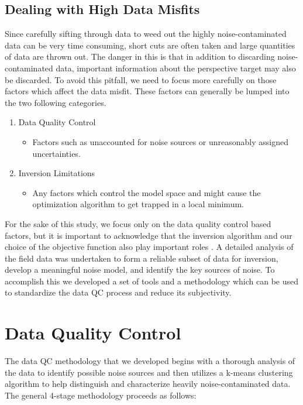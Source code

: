 \documentclass[final,authoryear,5p,times,twocolumn]{elsarticle}
\begin{document}
\subsection{Dealing with High Data Misfits}
\label{Dealing_With_High_Misfits}
Since carefully sifting through data to weed out the highly noise-contaminated data can be very time consuming, short cuts are often taken and large quantities of data are thrown out. The danger in this is that in addition to discarding noise-contaminated data, important information about the perspective target may also be discarded. To avoid this pitfall, we need to focus more carefully on those factors which affect the data misfit. These factors can generally be lumped into the two following categories. 

\begin{enumerate}
   \item Data Quality Control
      \begin{itemize}
         \item Factors such as unaccounted for noise sources or unreasonably assigned uncertainties.
      \end{itemize}
   \item Inversion Limitations
      \begin{itemize}
         \item Any factors which control the model space and might cause the optimization algorithm to get trapped in a local minimum. 
      \end{itemize}
\end{enumerate}

For the sake of this study, we focus only on the data quality control based factors, but it is important to acknowledge that the inversion algorithm and our choice of the objective function also play important roles \citep{Farquharson1998,Oldenburg2005}. A detailed analysis of the field data was undertaken to form a reliable subset of data for inversion, develop a meaningful noise model, and identify the key sources of noise. To accomplish this we developed a set of tools and a methodology which can be used to standardize the data QC process and reduce its subjectivity.

\section{Data Quality Control}
\label{Data_Quality_Control}

The data QC methodology that we developed begins with a thorough analysis of the data to identify possible noise sources and then utilizes a k-means clustering algorithm to help distinguish and characterize heavily noise-contaminated data. The general 4-stage methodology proceeds as follows:
\end{document}

